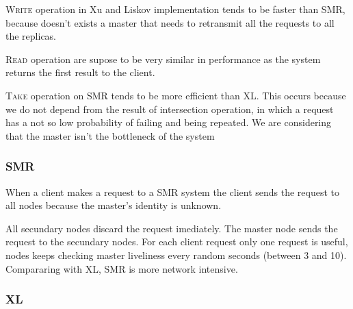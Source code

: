 \documentclass[times, 10pt,twocolumn]{article}
\begin{document}


\textsc{Write} operation in Xu and Liskov implementation tends to be faster than SMR, because doesn't exists a master
that needs to retransmit all the requests to all the replicas.

\textsc{Read} operation are supose to be very similar in performance as the system returns the first result to the client.

\textsc{Take} operation on SMR tends to be more efficient than XL. This occurs because we do not depend from the result 
of intersection operation, in which a request has a not so low probability of failing and being repeated. 
We are considering that the master isn't the bottleneck of the system  


\subsubsection{SMR}


When a client makes a request to a SMR system the client sends the request to all nodes because the master's identity is unknown.

All secundary nodes discard the request imediately. The master node
sends the request to the secundary nodes. For each client request only one request is useful, nodes keeps checking master liveliness every random seconds (between 3 and 10). 
Compararing with XL, SMR is more network intensive.

\subsubsection{XL}
\end{document}
